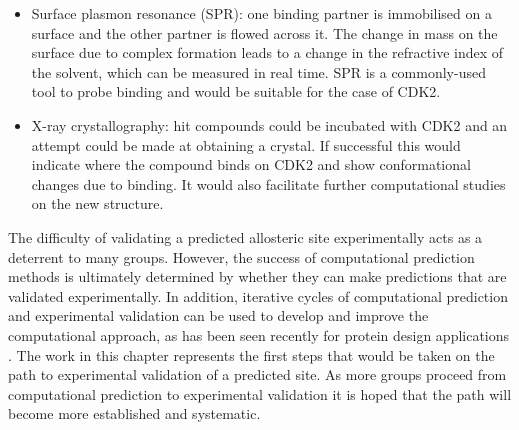 \begin{itemize}
\item Surface plasmon resonance (SPR): one binding partner is immobilised on a surface and the other partner is flowed across it.
The change in mass on the surface due to complex formation leads to a change in the refractive index of the solvent, which can be measured in real time.
SPR is a commonly-used tool to probe binding and would be suitable for the case of CDK2.
\item X-ray crystallography: hit compounds could be incubated with CDK2 and an attempt could be made at obtaining a crystal.
If successful this would indicate where the compound binds on CDK2 and show conformational changes due to binding.
It would also facilitate further computational studies on the new structure.

\end{itemize}

The difficulty of validating a predicted allosteric site experimentally acts as a deterrent to many groups.
However, the success of computational prediction methods is ultimately determined by whether they can make predictions that are validated experimentally.
In addition, iterative cycles of computational prediction and experimental validation can be used to develop and improve the computational approach, as has been seen recently for protein design applications \cite{Rocklin2017}.
The work in this chapter represents the first steps that would be taken on the path to experimental validation of a predicted site.
As more groups proceed from computational prediction to experimental validation \cite{Brecher2017} it is hoped that the path will become more established and systematic.
